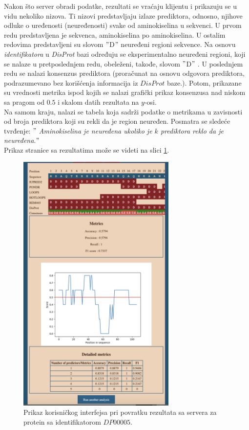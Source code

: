 Nakon što server obradi podatke, rezultati se vraćaju klijentu i prikazuju se u vidu nekoliko nizova. Ti nizovi predstavljaju izlaze prediktora, odnosno, njihove odluke o uređenosti (neuređenosti) svake od aminokiselina u sekvenci. U prvom redu predstavljena je sekvenca, aminokiselina po aminokiselina. U ostalim redovima predstavljeni su slovom $"$D$"$ neuređeni regioni sekvence. Na osnovu \textit{identifikatora} u \textit{DisProt} bazi određuju se eksperimentalno neuređeni regioni, koji se nalaze u pretposlednjem redu,  obeleženi, takođe, slovom $"$D$"$ . U poslednjem redu se nalazi konsenzus prediktora (proračunat na osnovu odgovora prediktora, podrazumevano bez korišćenja informacija iz $DisProt$ baze.). Potom, prikazane su vrednosti metrika ispod kojih se nalazi grafički prikaz konsenzusa nad niskom sa pragom od $0.5$ i skalom datih rezultata na $y$-osi.  \\ 
Na samom kraju, nalazi se tabela koja sadrži podatke o metrikama u zavisnosti od broja prediktora koji su rekli da je region neuređen. Posmatra se sledeće tvrđenje: $"$ \textit{Aminokiselina je neuređena ukoliko je $k$ prediktora reklo da je neuređena}.$"$ \\ 
Prikaz stranice sa rezultatima može se videti na slici \ref{fig:rezultati}.
\begin{figure}[H]
	\centering
    \includegraphics[width=0.7\textwidth]{Figures/App/rezultati.png}
    \caption{Prikaz korisničkog interfejsa pri povratku rezultata sa servera za protein sa identifikatorom $DP00005$.}
    \label{fig:rezultati}
\end{figure}


